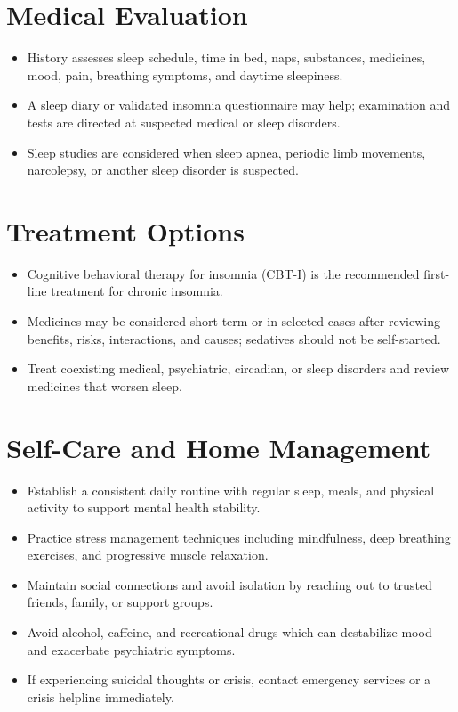 \section*{Medical Evaluation}
\begin{itemize}
  \item History assesses sleep schedule, time in bed, naps, substances, medicines, mood, pain, breathing symptoms, and daytime sleepiness.
  \item A sleep diary or validated insomnia questionnaire may help; examination and tests are directed at suspected medical or sleep disorders.
  \item Sleep studies are considered when sleep apnea, periodic limb movements, narcolepsy, or another sleep disorder is suspected.
\end{itemize}

\section*{Treatment Options}
\begin{itemize}
  \item Cognitive behavioral therapy for insomnia (CBT-I) is the recommended first-line treatment for chronic insomnia.
  \item Medicines may be considered short-term or in selected cases after reviewing benefits, risks, interactions, and causes; sedatives should not be self-started.
  \item Treat coexisting medical, psychiatric, circadian, or sleep disorders and review medicines that worsen sleep.
\end{itemize}

\section*{Self-Care and Home Management}
\begin{itemize}
  \item Establish a consistent daily routine with regular sleep, meals, and physical activity to support mental health stability.
  \item Practice stress management techniques including mindfulness, deep breathing exercises, and progressive muscle relaxation.
  \item Maintain social connections and avoid isolation by reaching out to trusted friends, family, or support groups.
  \item Avoid alcohol, caffeine, and recreational drugs which can destabilize mood and exacerbate psychiatric symptoms.
  \item If experiencing suicidal thoughts or crisis, contact emergency services or a crisis helpline immediately.
\end{itemize}

